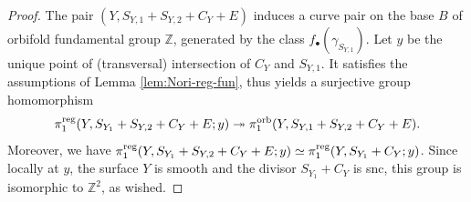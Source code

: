 \documentclass{amsart}
\newcommand{\zz}{\mathbb{Z}}
\theoremstyle{definition}
\theoremstyle{remark}
\numberwithin{equation}{section}
\newcommand{\cecile}[1]{\textcolor{red}{#1}}
\begin{document}
\begin{proof}
  The pair $(Y,S_{Y,1}+S_{Y,2}+C_Y+E)$ induces a curve pair on the base $B$ of orbifold fundamental group $\zz$, generated by the class $f_{\bullet}(\gamma_{S_{Y,1}})$. Let $y$ be the unique point of (transversal) intersection of $C_Y$ and $S_{Y,1}$. It satisfies the assumptions of Lemma \ref{lem:Nori-reg-fun}, thus yields a surjective group homomorphism
$$\pi_1^{\rm reg}(Y,S_{Y_1}+S_{Y,2}+C_Y+E;y)\twoheadrightarrow \pi_1^{\rm orb}(Y,S_{Y,1}+S_{Y,2}+C_Y+E).$$
Moreover, we have $\pi_1^{\rm reg}(Y,S_{Y_1}+S_{Y,2}+C_Y+E;y)\simeq \pi_1^{\rm reg}(Y,S_{Y_1}+C_Y;y)$. Since locally at $y$, the surface $Y$ is smooth and the divisor $S_{Y_1}+C_Y$ is snc, this group is isomorphic to $\zz^2$, as wished.
\end{proof}
\end{document}
